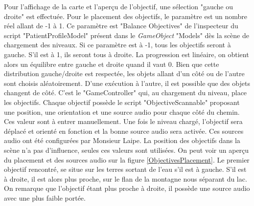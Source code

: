 		Pour l'affichage de la carte et l'aperçu de l'objectif, une sélection "gauche ou droite" est effectuée. Pour le placement des objectifs, le paramètre est un nombre réel allant de -1 à 1. Ce paramètre est "Balance Objectives" de l'inspecteur du script "PatientProfileModel" présent dans le \textit{GameObject} "Models" dès la scène de chargement des niveaux. Si ce paramètre est à -1, tous les objectifs seront à gauche. S'il est à 1, ils seront tous à droite. La progression est linéaire, on obtient alors un équilibre entre gauche et droite quand il vaut 0. Bien que cette distribution gauche/droite est respectée, les objets allant d'un côté ou de l'autre sont choisis aléatoirement. D'une exécution à l'autre, il est possible que des objets changent de côté. C'est le "GameController" qui, au chargement du niveau, place les objectifs. Chaque objectif possède le script "ObjectiveScannable" proposant une position, une orientation et une source audio pour chaque côté du chemin. Ces valeur sont à entrer manuellement. Une fois le niveau chargé, l'objectif sera déplacé et orienté en fonction et la bonne source audio sera activée. Ces sources audio ont été configurées par Monsieur Laipe. La position des objectifs dans la scène n'a pas d'influence, seules ces valeurs sont utilisées. On peut voir un aperçu du placement et des sources audio sur la figure \ref{ObjectivesPlacement}. Le premier objectif rencontré, se situe sur les terres sortant de l'eau s'il est à gauche. S'il est à droite, il est alors plus proche, sur le flan de la montagne nous séparant du lac. On remarque que l'objectif étant plus proche à droite, il possède une source audio avec une plus faible portée. \medskip
		
		\begin{minipage}{\linewidth}
			\label{ObjectivesPlacement}
		\end{minipage}\medskip
		
